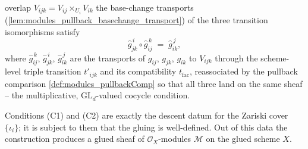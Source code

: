 \begin{definition}
\begin{enumerate}
      overlap \(V_{ijk} = V_{ij} \times_{U_i} V_{ik}\) the base-change transports
      (\cref{lem:modules_pullback_basechange_transport}) of the three transition
      isomorphisms satisfy
      \[
        \widehat{g}_{jk}^{\,i} \circ \widehat{g}_{ij}^{\,k}
          \;=\; \widehat{g}_{ik}^{\,j},
      \]
      where \(\widehat{g}_{ij}^{\,k}\), \(\widehat{g}_{jk}^{\,i}\),
      \(\widehat{g}_{ik}^{\,j}\) are the transports of \(g_{ij}\), \(g_{jk}\),
      \(g_{ik}\) to \(V_{ijk}\) through the scheme-level triple transition
      \(t'_{ijk}\) and its compatibility \(t_{\mathrm{fac}}\), reassociated by the
      pullback comparison \cref{def:modules_pullbackComp} so that all three land on
      the same sheaf -- the multiplicative, \(\mathrm{GL}_d\)-valued cocycle
      condition.
  \end{enumerate}
  Conditions (C1) and (C2) are exactly the descent datum for the Zariski cover
  \(\{\iota_i\}\); it is subject to them that the gluing is well-defined. Out of this
  data the construction produces a glued sheaf of \(\mathcal{O}_X\)-modules
  \(\mathcal{M}\) on the glued scheme \(X\).


\end{definition}
